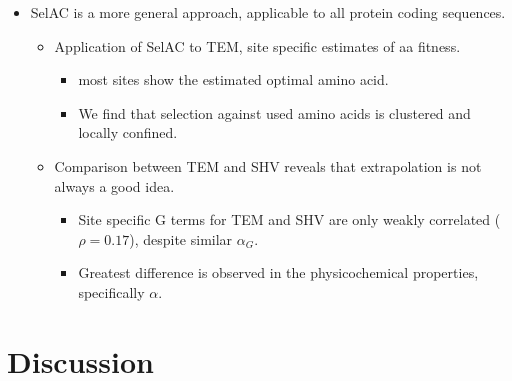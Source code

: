 \documentclass[12pt]{article}
\begin{document}
\begin{itemize}
 \item SelAC is a more general approach, applicable to all protein coding sequences.
 \begin{itemize}
  \item Application of SelAC to TEM, site specific estimates of aa fitness.
  \begin{itemize}
   \item most sites show the estimated optimal amino acid.
   \item We find that selection against used amino acids is clustered and locally confined.
  \end{itemize}
  \item Comparison between TEM and SHV reveals that extrapolation is not always a good idea.
  \begin{itemize}
   \item Site specific G terms for TEM and SHV are only weakly correlated ($\rho = 0.17$), despite similar $\alpha_G$.
   \item Greatest difference is observed in the physicochemical properties, specifically $\alpha$.
  \end{itemize}
 \end{itemize}
\end{itemize}

\section*{Discussion}
\end{document}

